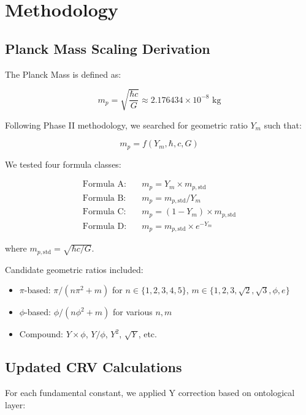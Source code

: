 \documentclass[11pt,a4paper]{article}
\begin{document}
\section{Methodology}

\subsection{Planck Mass Scaling Derivation}

The Planck Mass is defined as:

\begin{equation}
m_p = \sqrt{\frac{\hbar c}{G}} \approx 2.176434 \times 10^{-8} \text{ kg}
\end{equation}

Following Phase II methodology, we searched for geometric ratio $Y_m$ such that:

\begin{equation}
m_p = f(Y_m, \hbar, c, G)
\end{equation}

We tested four formula classes:

\begin{align}
\text{Formula A:} \quad & m_p = Y_m \times m_{p,\text{std}} \\
\text{Formula B:} \quad & m_p = m_{p,\text{std}} / Y_m \\
\text{Formula C:} \quad & m_p = (1 - Y_m) \times m_{p,\text{std}} \\
\text{Formula D:} \quad & m_p = m_{p,\text{std}} \times e^{-Y_m}
\end{align}

where $m_{p,\text{std}} = \sqrt{\hbar c / G}$.

Candidate geometric ratios included:
\begin{itemize}
    \item $\pi$-based: $\pi/(n\pi^2 + m)$ for $n \in \{1,2,3,4,5\}$, $m \in \{1,2,3,\sqrt{2},\sqrt{3},\phi,e\}$
    \item $\phi$-based: $\phi/(n\phi^2 + m)$ for various $n, m$
    \item Compound: $Y \times \phi$, $Y/\phi$, $Y^2$, $\sqrt{Y}$, etc.
\end{itemize}

\subsection{Updated CRV Calculations}

For each fundamental constant, we applied Y correction based on ontological layer:
\end{document}
